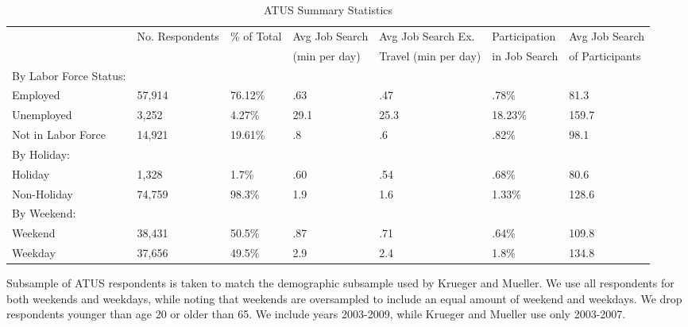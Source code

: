\documentclass[11pt, final]{article}
\begin{document}
\begin{sidewaystable}
\caption{ATUS Summary Statistics}
\label{tab:atussumm}
\centering
\begin{threeparttable}
\begin{tabular}{l|l|l|l|l|l|l}
\hline
 & No. Respondents & \% of Total & Avg Job Search  & Avg Job Search Ex.  & Participation & Avg Job Search  \\
 &	  &   &		 (min per day)  &	 Travel (min per day) 		& in Job Search &  of Participants  \\
\hline
By Labor Force Status:&   &   &  &  & &  \\
Employed &57,914   & 76.12\%  & .63  & .47 & .78\%  & 81.3  \\
Unemployed &3,252   &  4.27\% & 29.1 &  25.3 & 18.23\% & 159.7  \\
Not in Labor Force & 14,921  & 19.61\%   & .8  & .6 & .82\%  & 98.1 \\
\hline
By Holiday:&&&&&&\\
Holiday& 1,328& 1.7\% & .60 & .54 & .68\% & 80.6 \\
Non-Holiday& 74,759& 98.3\% & 1.9 & 1.6 & 1.33\% & 128.6 \\
\hline
By Weekend:&&&&&\\
Weekend&38,431& 50.5\% & .87 & .71 & .64\% & 109.8 \\
Weekday& 37,656& 49.5\% & 2.9 & 2.4 & 1.8\% & 134.8 \\
\hline
\end{tabular}
\begin{tablenotes}
\item \footnotesize Subsample of ATUS respondents is taken to match the demographic subsample used by Krueger and Mueller. We use all respondents for both weekends and weekdays, while noting that weekends are oversampled to include an equal amount of weekend and weekdays. We drop respondents younger than age 20 or older than 65. We include years 2003-2009, while Krueger and Mueller use only 2003-2007.
\end{tablenotes}
\end{threeparttable}
\end{sidewaystable}
\end{document}
